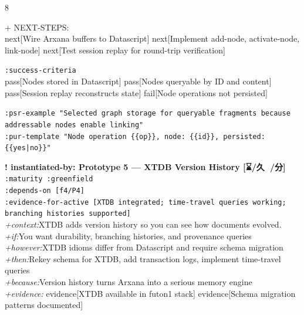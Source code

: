 \documentclass[landscape]{article}
\newcommand{\flexitag}[1]{\textcolor[gray]{0.35}{\textit{#1}}}
\newenvironment{devmapgreenfield}{%
  \def\FrameCommand{\colorbox{devmapgreenfieldbg}}%
  \setlength{\fboxsep}{2pt}%
  \MakeFramed{\advance\hsize-\width \FrameRestore}%
}{\endMakeFramed}
\begin{document}
\begin{paracol}{8}
\begin{devmapgreenfield}
\par
  + NEXT-STEPS:\\
    next[Wire Arxana buffers to Datascript] next[Implement add-node, activate-node, link-node] next[Test session replay for round-trip verification]\\
\par
  \texttt{:\allowbreak{}success-\allowbreak{}criteria}\\
    pass[Nodes stored in Datascript] pass[Nodes queryable by ID and content] pass[Session replay reconstructs state] fail[Node operations not persisted]\\
\par
  \texttt{:\allowbreak{}psr-\allowbreak{}example "Selected graph storage for queryable fragments because addressable nodes enable linking"}\\
  \texttt{:\allowbreak{}pur-\allowbreak{}template "Node operation \{\{op\}\},\allowbreak{} node:\allowbreak{} \{\{id\}\},\allowbreak{} persisted:\allowbreak{} \{\{yes|\allowbreak{}no\}\}"}\\
\par
\par
\end{devmapgreenfield}
\begin{devmapgreenfield}
\textbf{! instantiated-by: Prototype 5 — XTDB Version History [⌛️/久 🙅/分]}\\
  \texttt{:\allowbreak{}maturity :\allowbreak{}greenfield}\\
  \texttt{:\allowbreak{}depends-\allowbreak{}on [f4/\allowbreak{}P4]}\\
  \texttt{:\allowbreak{}evidence-\allowbreak{}for-\allowbreak{}active [XTDB integrated;\allowbreak{} time-\allowbreak{}travel queries working;\allowbreak{} branching histories supported]}\\
  \flexitag{+context:}XTDB adds version history so you can see how documents evolved.\\
  \flexitag{+if:}You want durability, branching histories, and provenance queries\\
  \flexitag{+however:}XTDB idioms differ from Datascript and require schema migration\\
  \flexitag{+then:}Rekey schema for XTDB, add transaction logs, implement time-travel queries\\
  \flexitag{+because:}Version history turns Arxana into a serious memory engine\\
  \flexitag{+evidence:} evidence[XTDB available in futon1 stack] evidence[Schema migration patterns documented]\\

\end{devmapgreenfield}
\end{paracol}
\end{document}
